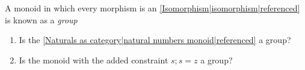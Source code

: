 
A monoid in which every morphism is an \ref{Isomorphism|isomorphism|referenced} is known as a \emph{group}
    \begin{enumerate}
      \item Is the \ref{Naturals as category|natural numbers monoid|referenced} a group?
      \item  Is the monoid with the added constraint $s;s=z$  a group?
    \end{enumerate}